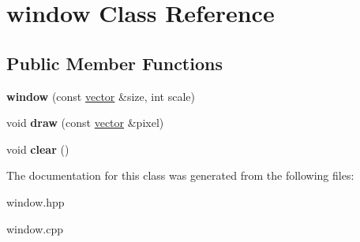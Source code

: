 \hypertarget{classwindow}{}\section{window Class Reference}
\label{classwindow}
\subsection*{Public Member Functions}
\begin{DoxyCompactItemize}
\item 
\mbox{\label{classwindow_aff77ec158264aa71b582800ec591a1f6}} 
{\bfseries window} (const \hyperlink{classvector}{vector} \&size, int scale)
\item 
\mbox{\label{classwindow_ac730fe4b61f64eb5ab519bade5c5eca0}} 
void {\bfseries draw} (const \hyperlink{classvector}{vector} \&pixel)
\item 
\mbox{\label{classwindow_a6c050475db28a9b773cf2edbc56ece86}} 
void {\bfseries clear} ()
\end{DoxyCompactItemize}


The documentation for this class was generated from the following files\+:\begin{DoxyCompactItemize}
\item 
window.\+hpp\item 
window.\+cpp\end{DoxyCompactItemize}
